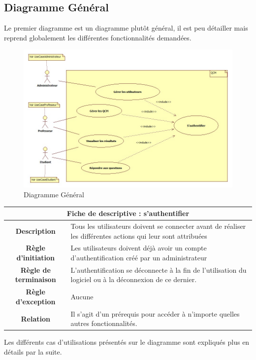 \documentclass[10pt,a4paper,titlepage]{report}
\begin{document}
	\subsection{Diagramme Général}
		Le premier diagramme est un diagramme plutôt général, il est peu détailler mais reprend globalement les différentes fonctionnalités demandées.
		\begin{figure}[h!]
		\caption{Diagramme Général}
		\centering
		\includegraphics[scale=0.4]{Include/General.jpg}
\end{figure}
\newline
	\begin{tabular}{|c|p{8cm}|}
	\hline 
	\multicolumn{2}{|c|}{\textbf{Fiche de descriptive : s'authentifier}} \\ 
	\hline 
	\textbf{Description} & Tous les utilisateurs doivent se connecter  avant de réaliser les différentes actions qui leur sont attribuées \\  
	\hline
	\textbf{Règle d'initiation} & Les utilisateurs doivent déjà avoir un compte d'authentification créé par un administrateur \\ 
	\hline 
	\textbf{Règle de terminaison} & L'authentification se déconnecte à la fin de l'utilisation du logiciel ou à la déconnexion de ce dernier. \\ 
	\hline 
	\textbf{Règle d'exception} & Aucune \\ 
	\hline 
	\textbf{Relation} & Il s'agit d'un prérequis pour accéder à n'importe quelles autres fonctionnalités.\\ 
	\hline 
	\end{tabular} \newline\newline
	Les différents cas d'utilisations présentés sur le diagramme sont expliqués plus en détails par la suite.
	
\end{document}
